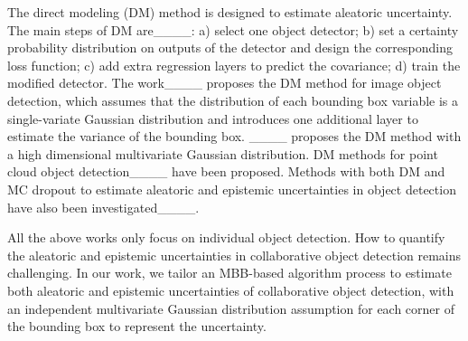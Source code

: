 The direct modeling (DM) method is designed to estimate aleatoric uncertainty. The main steps of DM are____: a) select one object detector; b) set a certainty probability distribution on outputs of the detector and design the corresponding loss function; c) add extra regression layers to predict the covariance; d) train the modified detector. The work____ proposes the DM method for image object detection, which assumes that the distribution of each bounding box variable is a single-variate Gaussian distribution and introduces one additional layer to estimate the variance of the bounding box. ____ proposes the DM method with a high dimensional multivariate Gaussian distribution. DM methods for point cloud object detection____ have been proposed. Methods with both DM and MC dropout to estimate aleatoric and epistemic uncertainties in object detection have also been investigated____. 

All the above works only focus on individual object detection. How to quantify the aleatoric and epistemic uncertainties in collaborative object detection remains challenging. In our work, we tailor an MBB-based algorithm process to estimate both aleatoric and epistemic uncertainties of collaborative object detection, with an independent multivariate Gaussian distribution assumption for each corner of the bounding box to represent the uncertainty.




